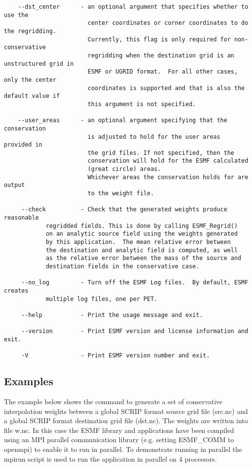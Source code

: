 \begin{verbatim}
    --dst_center      - an optional argument that specifies whether to use the 
                        center coordinates or corner coordinates to do the regridding.
                        Currently, this flag is only required for non-conservative
                        regridding when the destination grid is an unstructured grid in 
                        ESMF or UGRID format.  For all other cases, only the center
                        coordinates is supported and that is also the default value if
                        this argument is not specified.

    --user_areas      - an optional argument specifying that the conservation
                        is adjusted to hold for the user areas provided in
                        the grid files. If not specified, then the 
                        conservation will hold for the ESMF calculated 
                        (great circle) areas.
                        Whichever areas the conservation holds for are output
                        to the weight file.

     --check          - Check that the generated weights produce reasonable 
			regridded fields. This is done by calling ESMF_Regrid() 
			on an analytic source field using the weights generated 
			by this application.  The mean relative error between 
			the destination and analytic field is computed, as well 
			as the relative error between the mass of the source and 
			destination fields in the conservative case.

     --no_log         - Turn off the ESMF Log files.  By default, ESMF creates 
			multiple log files, one per PET.

     --help           - Print the usage message and exit.

     --version        - Print ESMF version and license information and exit.

     -V               - Print ESMF version number and exit.
\end{verbatim}


\subsection{Examples}

The example below shows the command to generate a set of conservative interpolation weights between a global
SCRIP format source grid file (src.nc) and a global SCRIP format destination grid file (dst.nc). The weights
are written into file w.nc. In this case the
ESMF library and applications have been compiled using an MPI parallel communication library
(e.g. setting ESMF\_COMM to openmpi) to enable it to run in parallel. To demonstrate running in parallel
the mpirun script is used to run the application in parallel on 4 processors.

